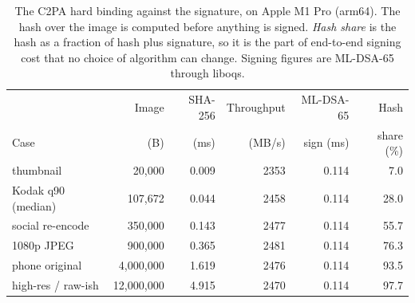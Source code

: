 \begin{table}[t]
\caption{The C2PA hard binding against the signature, on Apple M1 Pro (arm64). The hash over the image is computed before anything is signed. \emph{Hash share} is the hash as a fraction of hash plus signature, so it is the part of end-to-end signing cost that no choice of algorithm can change. Signing figures are ML-DSA-65 through liboqs.}
\label{tab:hash}
\small
\begin{tabular}{lrrrrr}
\toprule
 & Image & SHA-256 & Throughput & ML-DSA-65 & Hash\\
Case & (B) & (ms) & (MB/s) & sign (ms) & share (\%)\\
\midrule
thumbnail & 20,000 & 0.009 & 2353 & 0.114 & 7.0\\
Kodak q90 (median) & 107,672 & 0.044 & 2458 & 0.114 & 28.0\\
social re-encode & 350,000 & 0.143 & 2477 & 0.114 & 55.7\\
1080p JPEG & 900,000 & 0.365 & 2481 & 0.114 & 76.3\\
phone original & 4,000,000 & 1.619 & 2476 & 0.114 & 93.5\\
high-res / raw-ish & 12,000,000 & 4.915 & 2470 & 0.114 & 97.7\\
\bottomrule
\end{tabular}
\end{table}
